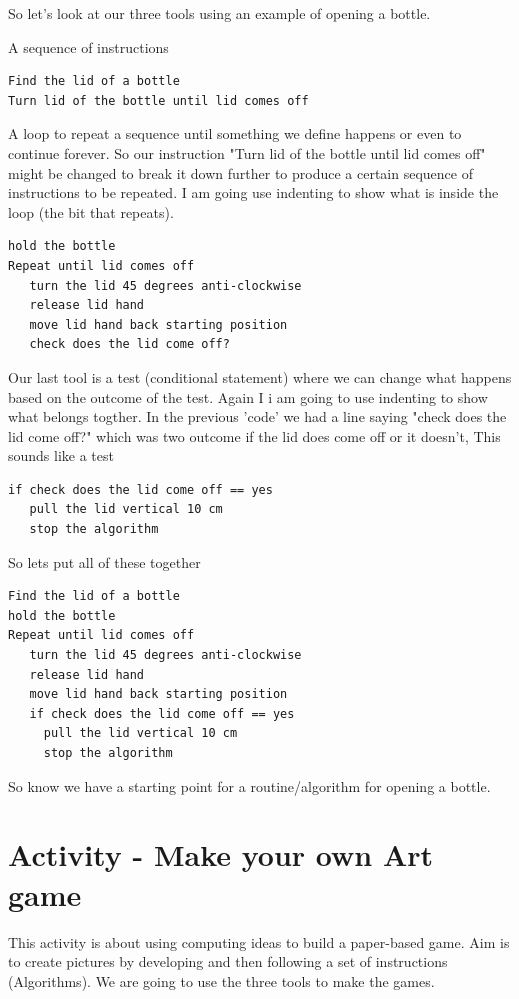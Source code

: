 So let's look at our three tools using an example of opening a bottle.

A sequence of instructions
\begin{lstlisting}
Find the lid of a bottle
Turn lid of the bottle until lid comes off
\end{lstlisting}

A loop to repeat a sequence until something we define happens or even to continue forever. So our instruction "Turn lid of the bottle until lid comes off" might be changed to break it down further to produce a certain sequence of instructions to be repeated. I am going use indenting to show what is inside the loop (the bit that repeats).
\begin{lstlisting}
hold the bottle
Repeat until lid comes off
   turn the lid 45 degrees anti-clockwise
   release lid hand 
   move lid hand back starting position
   check does the lid come off?
\end{lstlisting}

Our last tool is a test (conditional statement) where we can change what happens based on the outcome of the test. Again I i am going to use indenting to show what belongs togther. In the previous 'code' we had a line saying "check does the lid come off?" which was two outcome if the lid does come off or it doesn't, This sounds like a test

\begin{lstlisting}
if check does the lid come off == yes
   pull the lid vertical 10 cm
   stop the algorithm
\end{lstlisting}

So lets put all of these together
\begin{lstlisting}
Find the lid of a bottle
hold the bottle
Repeat until lid comes off
   turn the lid 45 degrees anti-clockwise
   release lid hand 
   move lid hand back starting position
   if check does the lid come off == yes
     pull the lid vertical 10 cm
     stop the algorithm
\end{lstlisting}

So know we have a starting point for a routine/algorithm for opening a bottle. 

\section{Activity - Make your own Art game}
This activity is about using computing ideas to build a paper-based game. Aim is to create pictures by developing and then following a set of instructions (Algorithms). We are going to use the three tools to make the games. 

